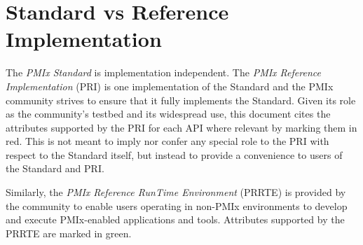 \section{Standard vs Reference Implementation}

The \textit{PMIx Standard} is implementation independent. The \textit{PMIx Reference Implementation} (PRI) is one implementation of the Standard and the \ac{PMIx} community strives to ensure that it fully implements the Standard. Given its role as the community's testbed and its widespread use, this document cites the attributes supported by the \ac{PRI} for each \ac{API} where relevant by marking them in {\color{red}red}. This is not meant to imply nor confer any special role to the \ac{PRI} with respect to the Standard itself, but instead to provide a convenience to users of the Standard and \ac{PRI}.

Similarly, the \textit{PMIx Reference RunTime Environment} (PRRTE) is provided by the community to enable users operating in non-\ac{PMIx} environments to develop and execute \ac{PMIx}-enabled applications and tools. Attributes supported by the \ac{PRRTE} are marked in {\color{green!60!black}green}.

